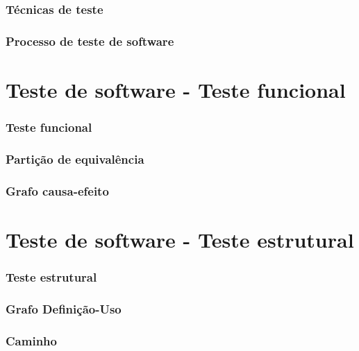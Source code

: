 \documentclass[utf8, usepdftitle=false, svgnames, color={table, fixpdftex, hyperref, fixinclude, xcdraw}, t, brazil]{beamer}
\begin{document}
 \section{Técnicas de teste}
  
 
 \section{Processo de teste de software}
  
 
 \part{Teste de software - Teste funcional}
 
 \section{Teste funcional}
 

 \section{Partição de equivalência}
 
 
 \section{Grafo causa-efeito}
  
 
 \part{Teste de software - Teste estrutural}
 
 \section{Teste estrutural}
 
 
 \section{Grafo Definição-Uso}
 

 \section{Caminho}
 
\end{document}
